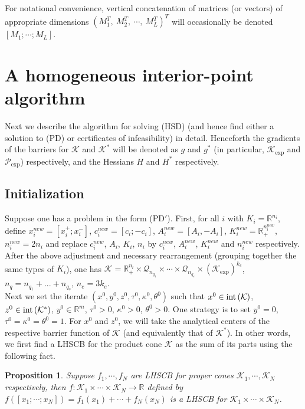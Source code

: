 \documentclass[11pt]{article}
\theoremstyle{definition}
\theoremstyle{plain}
\newtheorem{prop}{Proposition}
\def\interior{\protect{\textnormal{int}}}
\begin{document}
For notational convenience, vertical concatenation of matrices (or vectors) of appropriate dimensions $(M_1^T,\ M_2^T,\ \cdots,\ M_L^T)^T$ will occasionally be denoted $[M_1; \cdots ; M_L]$.

\section{A homogeneous interior-point algorithm}
Next we describe the algorithm for solving (HSD) (and hence find either a solution to (PD) or certificates of infeasibility) in detail. Henceforth the gradients of the barriers for $\mathcal{K}$ and $\mathcal{K}^*$ will be denoted as $g$ and $g^*$ (in particular, $\mathcal{K}_{\exp}$ and $\mathcal{P}_{\exp}$) respectively, and the Hessians $H$ and $H^*$ respectively.
\subsection{Initialization}

Suppose one has a problem in the form (PD$'$). First, for all $i$ with $K_i = \mathbb{R}^{n_i}$, define $x_i^{new} = [x_i^+; x_i^-]$, $c_i^{new} = [c_i; -c_i]$, $A_i^{new} = [A_i, -A_i]$, $K_i^{new} = \mathbb{R}_+^{n_i^{new}}$, $n_i^{new} = 2n_i$ and replace $c_i^{new}$, $A_i$, $K_i$, $n_i$ by $c_i^{new}$, $A_i^{new}$, $K_i^{new}$ and $n_i^{new}$ respectively. After the above adjustment and necessary rearrangement (grouping together the same types of $K_i$), one has $\mathcal{K} = \mathbb{R}_+^{n_l} \times \mathcal{Q}_{n_{q_1}} \times \cdots \times \mathcal{Q}_{n_{q_s}} \times \left(\mathcal{K}_{\exp}\right)^{k_e}$, $n_q = n_{q_1} + ... + n_{q_s}$, $n_e = 3k_e$. \\

Next we set the iterate $(x^0,y^0, z^0, \tau^0, \kappa^0, \theta^0)$ such that $x^0 \in \interior\left(\mathcal{K}\right)$, $z^0 \in \interior\left(\mathcal{K}^*\right)$, $y^0 \in \mathbb{R}^m$, $\tau^0 > 0$, $\kappa^0 > 0$, $\theta^0>0$. One strategy is to set $y^0 = 0$, $\tau^0 = \kappa^0 = \theta^0 = 1$. For $x^0$ and $z^0$, we will take the analytical centers of the respective barrier function of $\mathcal{K}$ (and equivalently that of $\mathcal{K}^*$). In other words, we first find a LHSCB for the product cone $\mathcal{K}$ as the sum of its parts using the following fact.
\begin{prop}
	Suppose $f_1, \cdots , f_N$ are LHSCB for proper cones $\mathcal{K}_1, \cdots, \mathcal{K}_N$ respectively, then $f: \mathcal{K}_1 \times\cdots\times \mathcal{K}_N \rightarrow \mathbb{R}$ defined by $f([x_1;\cdots; x_N]) = f_1(x_1) + \cdots + f_N(x_N)$ is a LHSCB for $\mathcal{K}_1 \times \cdots \times \mathcal{K}_N$.
\end{prop}
\end{document}
